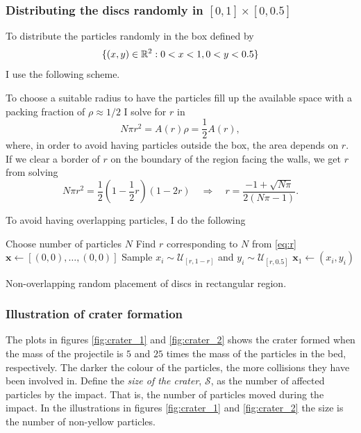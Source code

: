 \subsubsection{Distributing the discs randomly in $[0,1]\times[0,0.5]$}

To distribute the particles randomly in the box defined by 
$$
\{(x,y)\in \mathbb{R}^2 : 0 < x < 1, 0 < y < 0.5\}
$$ 
I use the following scheme. 

To choose a suitable radius to have the particles fill up the available space with a packing fraction of $\rho \approx 1/2$ I solve for $r$ in 
$$
	N \pi r^2 = A(r) \rho = \frac{1}{2} A(r),  
$$
where, in order to avoid having particles outside the box, the area depends on $r$. If we clear a border of $r$ on the boundary of the region facing the walls, we get $r$ from solving
\begin{equation}\label{eq:r}
	N \pi r^2 = \frac{1}{2} \left(1- \frac{1}{2}r\right) \left(1-2r\right) \quad \Rightarrow \quad r = \frac{-1 + \sqrt{N\pi}}{2(N\pi - 1)}.
\end{equation}

To avoid having overlapping particles, I do the following

\begin{algorithm}[H]
	Choose number of particles $N$\;
	Find $r$ corresponding to $N$ from \eqref{eq:r}\;
	$\mathbf{x} \gets [(0,0),\dots,(0,0)]$\;
	Sample $x_i \sim \mathcal{U}_{[r,1-r]}$ and $y_i \sim \mathcal{U}_{[r,0.5]}$\;
	$\mathbf{x}_1 \gets (x_i,y_i)$\;
	\caption{Non-overlapping random placement of discs in rectangular region.}
\end{algorithm}  

\subsubsection{Illustration of crater formation}

The plots in figures \ref{fig:crater_1} and \ref{fig:crater_2} shows the crater formed when the mass of the projectile is $5$ and $25$ times the mass of the particles in the bed, respectively. The darker the colour of the particles, the more collisions they have been involved in. Define the \textit{size of the crater}, $\mathcal{S}$, as the number of affected particles by the impact. That is, the number of particles moved during the impact. In the illustrations in figures \ref{fig:crater_1} and \ref{fig:crater_2} the size is the number of non-yellow particles. 

